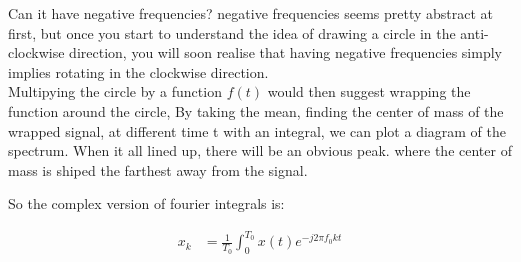 \documentclass{article}
\begin{document}
    Can it have negative frequencies? negative frequencies seems pretty abstract at first, 
    but once you start to understand the idea of drawing a circle in the anti-clockwise direction,
    you will soon realise that having negative frequencies simply implies rotating in the clockwise direction.\\

    Multipying the circle by a function $f(t)$ would then suggest wrapping the function around the circle,
    By taking the mean, finding the center of mass of the wrapped signal, at different time t with an integral, we can plot a diagram of the spectrum.
    When it all lined up, there will be an obvious peak. where the center of mass is shiped the farthest away from the signal.

    So the complex version of fourier integrals is:

    \begin{align}
        x_k &= \frac{1}{T_0} \int_{0}^{T_0} x(t) e^{-j 2 \pi f_0 kt}
    \end{align}



   
\end{document}
